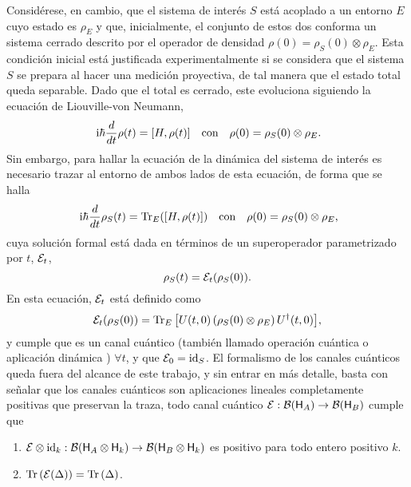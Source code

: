 Considérese, en cambio, que el sistema de interés $S$ está acoplado a un entorno $E$ cuyo estado es $\rho_{E}$ y que, inicialmente, el conjunto de estos dos conforma un sistema cerrado descrito por el operador de densidad $\rho(0)=\rho_{S}(0)\otimes\rho_{E}$. Esta condición inicial está justificada experimentalmente si se considera que el sistema $S$ se prepara al hacer una medición proyectiva, de tal manera que el estado total queda separable. Dado que el total es cerrado, este evoluciona siguiendo la ecuación de Liouville-von Neumann,
\begin{align}
    \rmi\hbar\frac{d}{d t} \rho(t)=[H,\rho(t)] && \text{con} && \rho(0)=\rho_{S}(0)\otimes\rho_{E}\rlap{.}\nonumber
\end{align}
Sin embargo, para hallar la ecuación de la dinámica del sistema de interés es necesario trazar al entorno de ambos lados de esta ecuación, de forma que se halla
\begin{align}
    \rmi\hbar\frac{d}{d t} \rho_{S}(t)=\Tr_{E}([H,\rho(t)]) && \text{con} && \rho(0)=\rho_{S}(0)\otimes\rho_{E}\rlap{,}\nonumber
\end{align}
cuya solución formal está dada en términos de un superoperador parametrizado por $t$, $\mathcal{E}_{t}$,
\begin{equation}
    \rho_{S}(t)=\mathcal{E}_{t}(\rho_{S}(0)).\nonumber
\end{equation}
En esta ecuación, $\mathcal{E}_{t}$ está definido como
 \begin{equation}
    \mathcal{E}_{t}(\rho_{S}(0))=\Tr_{E}\qty[U(t,0)\left(\rho_{S}(0)\otimes\rho_{E}\right)U^{\dag}(t,0)],\nonumber
 \end{equation}
 y cumple que es un canal cuántico \cite{Ziman} (también llamado operación cuántica \cite{Chuang} o aplicación dinámica \cite{Breuer}) $\forall t$, y que $\mathcal{E}_0=\text{id}_S$. El formalismo de los canales cuánticos queda fuera del alcance de este trabajo, y sin entrar en más detalle, basta con señalar que los canales cuánticos son aplicaciones lineales completamente positivas que preservan la traza, \ie{} todo canal cuántico $\mathcal{E}:\mathcal{B}({\sf H}_{A})\rightarrow \mathcal{B}({\sf H}_{B})$ cumple que \cite{Watrous}
 \begin{enumerate}
    \item $\mathcal{E}\otimes \text{id}_{k}: \mathcal{B}({\sf H}_A \otimes {\sf H}_k)\to \mathcal{B}({\sf H}_B \otimes {\sf H}_k)$ es positivo para todo entero positivo $k$.
    \item $\Tr\qty(\mathcal{E}(\Delta))=\Tr\qty(\Delta)$.
 \end{enumerate}
